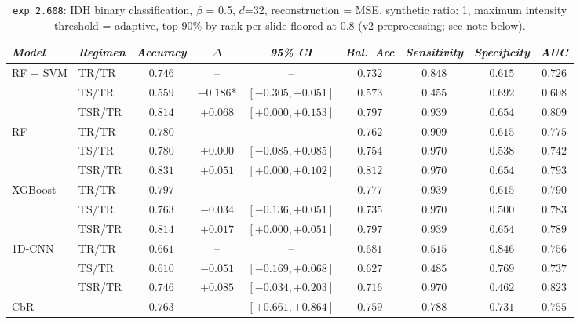 \begin{table}[H]
\centering
\scriptsize

\label{tab:ctrl_exp_2.608}
\begin{tabular*}{\textwidth}{@{\extracolsep{\fill}}llccccccc}
\toprule
\emph{Model} & \emph{Regimen} & \emph{Accuracy} & \emph{$\Delta$} & \emph{95\% CI} & \emph{Bal.\ Acc} & \emph{Sensitivity} & \emph{Specificity} & \emph{AUC}\\
\midrule
\multirow{3}{*}{RF + SVM} & TR/TR & $0.746$ & -- & -- & $0.732$ & $0.848$ & $0.615$ & $0.726$\\
 & TS/TR & $0.559$ & $-0.186$* & $[-0.305, -0.051]$ & $0.573$ & $0.455$ & $0.692$ & $0.608$\\
 & TSR/TR & $0.814$ & $+0.068$ & $[+0.000, +0.153]$ & $0.797$ & $0.939$ & $0.654$ & $0.809$\\
\midrule
\multirow{3}{*}{RF} & TR/TR & $0.780$ & -- & -- & $0.762$ & $0.909$ & $0.615$ & $0.775$\\
 & TS/TR & $0.780$ & $+0.000$ & $[-0.085, +0.085]$ & $0.754$ & $0.970$ & $0.538$ & $0.742$\\
 & TSR/TR & $0.831$ & $+0.051$ & $[+0.000, +0.102]$ & $0.812$ & $0.970$ & $0.654$ & $0.793$\\
\midrule
\multirow{3}{*}{XGBoost} & TR/TR & $0.797$ & -- & -- & $0.777$ & $0.939$ & $0.615$ & $0.790$\\
 & TS/TR & $0.763$ & $-0.034$ & $[-0.136, +0.051]$ & $0.735$ & $0.970$ & $0.500$ & $0.783$\\
 & TSR/TR & $0.814$ & $+0.017$ & $[+0.000, +0.051]$ & $0.797$ & $0.939$ & $0.654$ & $0.789$\\
\midrule
\multirow{3}{*}{1D-CNN} & TR/TR & $0.661$ & -- & -- & $0.681$ & $0.515$ & $0.846$ & $0.756$\\
 & TS/TR & $0.610$ & $-0.051$ & $[-0.169, +0.068]$ & $0.627$ & $0.485$ & $0.769$ & $0.737$\\
 & TSR/TR & $0.746$ & $+0.085$ & $[-0.034, +0.203]$ & $0.716$ & $0.970$ & $0.462$ & $0.823$\\
\midrule
CbR & -- & $0.763$ & -- & $[+0.661, +0.864]$ & $0.759$ & $0.788$ & $0.731$ & $0.755$\\
\bottomrule
\end{tabular*}
\caption{\small \texttt{exp\_2.608}: IDH binary classification, $\beta$ = 0.5, $d$=32, reconstruction = MSE, synthetic ratio: 1, maximum intensity threshold = adaptive, top-90\%-by-rank per slide floored at $0.8$ (v2 preprocessing; see note below).}
\end{table}

